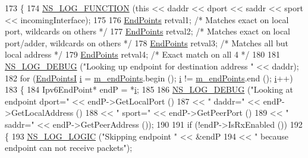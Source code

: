 \begin{DoxyCode}
173 \{
174   \hyperlink{log-macros-disabled_8h_a90b90d5bad1f39cb1b64923ea94c0761}{NS\_LOG\_FUNCTION} (\textcolor{keyword}{this} << daddr << dport << saddr << sport << incomingInterface);
175 
176   \hyperlink{classns3_1_1Ipv6EndPointDemux_a40c1d59189759e1e7f5cabe7cd01c0fa}{EndPoints} retval1; \textcolor{comment}{/* Matches exact on local port, wildcards on others */}
177   \hyperlink{classns3_1_1Ipv6EndPointDemux_a40c1d59189759e1e7f5cabe7cd01c0fa}{EndPoints} retval2; \textcolor{comment}{/* Matches exact on local port/adder, wildcards on others */}
178   \hyperlink{classns3_1_1Ipv6EndPointDemux_a40c1d59189759e1e7f5cabe7cd01c0fa}{EndPoints} retval3; \textcolor{comment}{/* Matches all but local address */}
179   \hyperlink{classns3_1_1Ipv6EndPointDemux_a40c1d59189759e1e7f5cabe7cd01c0fa}{EndPoints} retval4; \textcolor{comment}{/* Exact match on all 4 */}
180 
181   \hyperlink{group__logging_ga413f1886406d49f59a6a0a89b77b4d0a}{NS\_LOG\_DEBUG} (\textcolor{stringliteral}{"Looking up endpoint for destination address "} << daddr);
182   \textcolor{keywordflow}{for} (\hyperlink{classns3_1_1Ipv6EndPointDemux_a79d7b69805dbd45a902e5e6b375e752b}{EndPointsI} \hyperlink{bernuolliDistribution_8m_a6f6ccfcf58b31cb6412107d9d5281426}{i} = \hyperlink{classns3_1_1Ipv6EndPointDemux_a426db7bf82f46d87aa92afa3c3b927d9}{m\_endPoints}.begin (); \hyperlink{bernuolliDistribution_8m_a6f6ccfcf58b31cb6412107d9d5281426}{i} != 
      \hyperlink{classns3_1_1Ipv6EndPointDemux_a426db7bf82f46d87aa92afa3c3b927d9}{m\_endPoints}.end (); \hyperlink{bernuolliDistribution_8m_a6f6ccfcf58b31cb6412107d9d5281426}{i}++)
183     \{
184       Ipv6EndPoint* endP = *\hyperlink{bernuolliDistribution_8m_a6f6ccfcf58b31cb6412107d9d5281426}{i};
185 
186       \hyperlink{group__logging_ga413f1886406d49f59a6a0a89b77b4d0a}{NS\_LOG\_DEBUG} (\textcolor{stringliteral}{"Looking at endpoint dport="} << endP->GetLocalPort ()
187                                                  << \textcolor{stringliteral}{" daddr="} << endP->GetLocalAddress ()
188                                                  << \textcolor{stringliteral}{" sport="} << endP->GetPeerPort ()
189                                                  << \textcolor{stringliteral}{" saddr="} << endP->GetPeerAddress ());
190 
191       \textcolor{keywordflow}{if} (!endP->IsRxEnabled ())
192         \{
193           \hyperlink{group__logging_ga88acd260151caf2db9c0fc84997f45ce}{NS\_LOG\_LOGIC} (\textcolor{stringliteral}{"Skipping endpoint "} << &endP
194                         << \textcolor{stringliteral}{" because endpoint can not receive packets"});

\end{DoxyCode}
